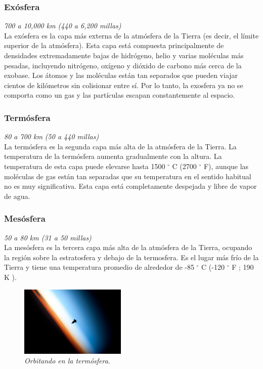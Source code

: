 \documentclass[12pt]{article}
\begin{document}
\subsubsection{Exósfera}
\textit{700 a 10,000 km (440 a 6,200 millas)}\\
La exósfera es la capa más externa de la atmósfera de la Tierra (es decir, el límite superior de la atmósfera). Esta capa está compuesta principalmente de densidades extremadamente bajas de hidrógeno, helio y varias moléculas más pesadas, incluyendo nitrógeno, oxígeno y dióxido de carbono más cerca de la exobase. Los átomos y las moléculas están tan separados que pueden viajar cientos de kilómetros sin colisionar entre sí. Por lo tanto, la exosfera ya no se comporta como un gas y las partículas escapan constantemente al espacio.

\subsubsection{Termósfera}
\textit{80 a 700 km (50 a 440 millas)}\\
La termósfera es la segunda capa más alta de la atmósfera de la Tierra. La temperatura de la termósfera aumenta gradualmente con la altura. La temperatura de esta capa puede elevarse hasta 1500 $^{\circ}$ C (2700 $^{\circ}$ F), aunque las moléculas de gas están tan separadas que su temperatura en el sentido habitual no es muy significativa.
Esta capa está completamente despejada y libre de vapor de agua.

\subsubsection{Mesósfera}
\textit{50 a 80 km (31 a 50 millas)}\\
La mesósfera es la tercera capa más alta de la atmósfera de la Tierra, ocupando la región sobre la estratosfera y debajo de la termosfera. Es el lugar más frío de la Tierra y tiene una temperatura promedio de alrededor de -85  $^{\circ}$ C (-120  $^{\circ}$ F ; 190  K ). 

\begin{figure} 
\includegraphics[width=0.45\textwidth]{explo.jpg}
\caption{\textit{Orbitando en la termósfera.}}
\end{figure}
\end{document}
